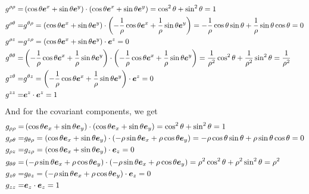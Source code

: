 \begin{align*}
    g^{\rho\rho}
    =&
    \left(
      \cos\theta\boldsymbol{e}^x
      + \sin\theta\boldsymbol{e}^y
    \right)
    \cdot
    \left(
      \cos\theta\boldsymbol{e}^x
      + \sin\theta\boldsymbol{e}^y
    \right)
    =
      \cos^2\theta
      + \sin^2\theta
    =
    1
    \\
    g^{\rho\theta}
    =&
    g^{\theta\rho}
    =
    \left(
      \cos\theta\boldsymbol{e}^x
      + \sin\theta\boldsymbol{e}^y
    \right)
    \cdot
    \left(
      -\frac{1}{\rho}\cos\theta\boldsymbol{e}^x
      + \frac{1}{\rho}\sin\theta\boldsymbol{e}^y
    \right)
    =
      -\frac{1}{\rho}\cos\theta\sin\theta
      + \frac{1}{\rho}\sin\theta\cos\theta
    =
    0
    \\
    g^{\rho z}
    =&
    g^{z \rho}
    =
    \left(
      \cos\theta\boldsymbol{e}^x
      + \sin\theta\boldsymbol{e}^y
    \right) \cdot \boldsymbol{e}^z = 0
    \\
    g^{\theta\theta}
    =&
    \left(
      -\frac{1}{\rho}\cos\theta\boldsymbol{e}^x
      + \frac{1}{\rho}\sin\theta\boldsymbol{e}^y
    \right)
    \cdot
    \left(
      -\frac{1}{\rho}\cos\theta\boldsymbol{e}^x
      + \frac{1}{\rho}\sin\theta\boldsymbol{e}^y
    \right)
    =
      \frac{1}{\rho^2}\cos^2\theta
      + \frac{1}{\rho^2}\sin^2\theta
    =
    \frac{1}{\rho^2}
    \\
    g^{z\theta}
    =&
    g^{\theta z}
    =
    \left(
      -\frac{1}{\rho}\cos\theta\boldsymbol{e}^x
      + \frac{1}{\rho}\sin\theta\boldsymbol{e}^y
    \right) \cdot \boldsymbol{e}^z = 0
    \\
    g^{z z}
    =&
    \boldsymbol{e}^z \cdot \boldsymbol{e}^z =1
\end{align*}
%
And for the covariant components, we get
%
\begin{align*}
    g_{\rho\rho}
    =&
    \left(
      \cos\theta\boldsymbol{e}_x
      + \sin\theta\boldsymbol{e}_y
    \right)
    \cdot
    \left(
      \cos\theta\boldsymbol{e}_x
      + \sin\theta\boldsymbol{e}_y
    \right)
    =
      \cos^2\theta
      + \sin^2\theta
    =
    1
    \\
    g_{\rho\theta}
    =&
    g_{\theta\rho}
    =
    \left(
      \cos\theta\boldsymbol{e}_x
      + \sin\theta\boldsymbol{e}_y
    \right)
    \cdot
    \left(
      -\rho\sin\theta\boldsymbol{e}_x
      + \rho\cos\theta\boldsymbol{e}_y
    \right)
    =
      -\rho\cos\theta\sin\theta
      + \rho\sin\theta\cos\theta
    =
    0
    \\
    g_{\rho z}
    =&
    g_{z \rho}
    =
    \left(
      \cos\theta\boldsymbol{e}_x
      + \sin\theta\boldsymbol{e}_y
    \right) \cdot \boldsymbol{e}_z = 0
    \\
    g_{\theta\theta}
    =&
    \left(
      -\rho\sin\theta\boldsymbol{e}_x
      + \rho\cos\theta\boldsymbol{e}_y
    \right)
    \cdot
    \left(
      -\rho\sin\theta\boldsymbol{e}_x
      + \rho\cos\theta\boldsymbol{e}_y
    \right)
    =
      \rho^2\cos^2\theta
      + \rho^2\sin^2\theta
    =
    \rho^2
    \\
    g_{z\theta}
    =&
    g_{\theta z}
    =
    \left( -\rho\sin\theta\boldsymbol{e}_x
      + \rho\cos\theta\boldsymbol{e}_y \right) \cdot \boldsymbol{e}_z
    =
    0
    \\
    g_{z z} =&
    \boldsymbol{e}_z \cdot \boldsymbol{e}_z =1
\end{align*}
